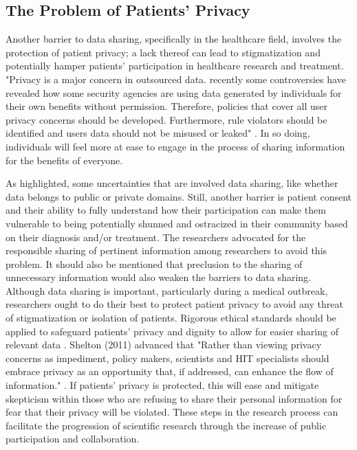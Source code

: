 \documentclass[sigconf]{acmart}
\begin{document}
\subsection{The Problem of Patients' Privacy}

Another barrier to data sharing, specifically in the healthcare field, involves the protection of patient privacy; a lack thereof can lead to stigmatization and potentially hamper patients’ participation in healthcare research and treatment. "Privacy is a major concern in outsourced data. recently some controversies have revealed how some security agencies are using data generated by individuals for their own benefits without permission. Therefore, policies that cover all user privacy concerns should be developed. Furthermore, rule violators should be identified and users data should not be misused or leaked" \cite{khan2014big}. In so doing, individuals will feel more at ease to engage in the process of sharing information for the benefits of everyone.

As \cite{yozwiak2015data} highlighted, some uncertainties that are involved data sharing, like whether data belongs to public or private domains. Still, another barrier is patient consent and their ability to fully understand how their participation can make them vulnerable to being potentially shunned and ostracized in their community based on their diagnosis and/or treatment. The researchers advocated for the responsible sharing of pertinent information among researchers to avoid this problem. It should also be mentioned that preclusion to the sharing of unnecessary information would also weaken the barriers to data sharing. Although data sharing is important, particularly during a medical outbreak, researchers ought to do their best to protect patient privacy to avoid any threat of stigmatization or isolation of patients. Rigorous ethical standards should be applied to safeguard patients’ privacy and dignity to allow for easier sharing of relevant data \cite{yozwiak2015data}. Shelton (2011) advanced that "Rather than viewing privacy concerns as impediment, policy makers, scientists and HIT specialists should embrace privacy as an opportunity that, if addressed, can enhance the flow of information." \cite{shelton2011electronic}. If patients' privacy is protected, this will ease and mitigate skepticism within those who are refusing to share their personal information for fear that their privacy will be violated. These steps in the research process can facilitate the progression of scientific research through the increase of public participation and collaboration. 
\end{document}
